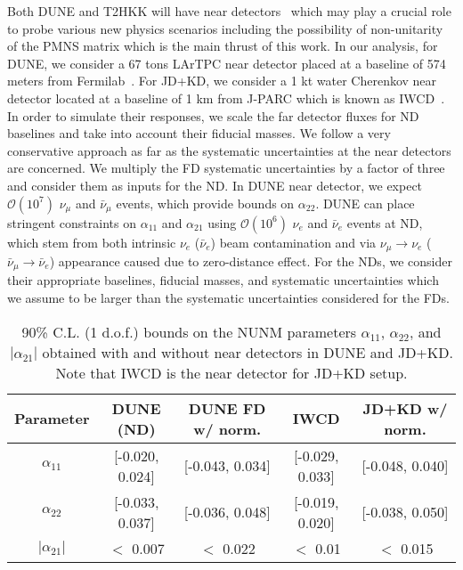 \documentclass[11pt,a4paper]{article}
\newcommand{\aee}{\ensuremath{\alpha_{11}}}
\newcommand{\ame}{\ensuremath{\alpha_{21}}}
\newcommand{\amm}{\ensuremath{\alpha_{22}}}
\newcommand{\capdef}{}
\newcommand{\mycaption}[2][\capdef]{\renewcommand{\capdef}{#2}
	\caption[#1]{{\footnotesize #2}}}
\begin{document}
Both DUNE and T2HKK will have near detectors~\cite{Miranda:2018yym,DUNE:2021tad,Coloma:2021uhq} which may play a crucial role to probe various new physics scenarios including the possibility of non-unitarity of the PMNS matrix which is the main thrust of this work. In our analysis, for DUNE, we consider a 67 tons LArTPC near detector placed at a baseline of 574 meters from Fermilab~\cite{DUNE:2021tad}. For JD+KD, we consider a 1 kt water Cherenkov near detector located at a baseline of 1 km from J-PARC which is known as IWCD~\cite{Drakopoulou:2017qdu, Wilson:2020trq}.
In order to simulate their responses, we scale the far detector fluxes for ND baselines and take into account their fiducial masses. We follow a very conservative approach as far as the systematic uncertainties at the near detectors are concerned. We multiply the FD systematic uncertainties by a factor of three and consider them as inputs for the ND.
 In DUNE near detector, we expect $\mathcal{O}(10^7)$ $\nu_\mu$ and $\bar{\nu}_{\mu}$ events, which provide bounds on $\alpha_{22}$. DUNE can place stringent constraints on $\alpha_{11}$ and $\alpha_{21}$ using $\mathcal{O}(10^6)$ $\nu_e$ and $\bar{\nu}_e$ events at ND, which stem from both intrinsic $\nu_e$ ($\bar{\nu}_e$) beam contamination and via $\nu_\mu\to\nu_e$ ($\bar{\nu}_\mu\rightarrow\bar{\nu}_e$) appearance caused due to zero-distance effect. 
  For the NDs, we consider their appropriate baselines, fiducial masses, and systematic uncertainties which we assume to be larger than the systematic uncertainties considered for the FDs. 
 
 \begin{table}
 	\centering
 	\begin{adjustbox}{width=\textwidth}
 		\begin{tabular}{|c|c|c|c|c|}
 			\hline\hline
 			Parameter & DUNE (ND) & DUNE FD w/ norm. &  IWCD & JD+KD w/ norm.\\ 
 			\hline
 			$\alpha_{11}$& [-0.020, 0.024] & [-0.043, 0.034] & [-0.029, 0.033] & [-0.048, 0.040] \\
 			\hline
 			$\alpha_{22}$ & [-0.033, 0.037] & [-0.036, 0.048] & [-0.019, 0.020] & [-0.038, 0.050] \\
 			\hline
 			$|\alpha_{21}|$ & $<$ 0.007 & $<$ 0.022 & $<$ 0.01 & $<$ 0.015 \\
 			\hline\hline
 		\end{tabular}
 	\end{adjustbox}
 	\mycaption{90\% C.L. (1 d.o.f.)	bounds on the NUNM parameters $\aee$, $\amm$, and $|\ame|$ obtained with and without near detectors in DUNE and JD+KD. Note that IWCD is the near detector for JD+KD setup.}
 	\label{tab:NearDetector}
 \end{table}
 
\end{document}
